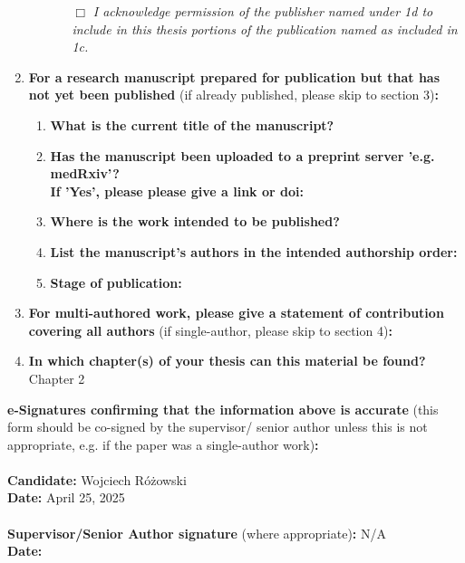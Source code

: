 \begin{enumerate}
\begin{enumerate}
\begin{itemize}
				\item[$\Box$] {\itshape I acknowledge permission of the publisher named under 1d to include in this thesis portions of the publication named as included in 1c.}
			\end{itemize}
%		
		\end{enumerate}
%	
		\item \textbf{For a research manuscript prepared for publication but that has not yet been published} (if already published, please skip to section 3)\textbf{:}
%		
		\begin{enumerate}\itemsep0em
			\item \textbf{What is the current title of the manuscript?}
			\item \textbf{Has the manuscript been uploaded to a preprint server 'e.g. medRxiv'? 
			\\
			If 'Yes', please please give a link or doi:}
			\item \textbf{Where is the work intended to be published?}
			\item \textbf{List the manuscript's authors in the intended authorship order:}
			\item \textbf{Stage of publication:}
		\end{enumerate}
		
		\item \textbf{For multi-authored work, please give a statement of contribution covering all authors} (if single-author, please skip to section 4)\textbf{:}
		


		\item \textbf{In which chapter(s) of your thesis can this material be found?}\\
		Chapter 2
	\end{enumerate}

		\textbf{e-Signatures confirming that the information above is accurate}
		(this form should be co-signed by the supervisor/ senior author unless this is not appropriate, e.g. if the paper was a single-author work)\textbf{:}\\
		\textbf{}\\ 
		\textbf{Candidate:}  Wojciech R\'{o}\.{z}owski\\
		\textbf{Date:} April 25, 2025\\
		\textbf{}\\
		\textbf{Supervisor/Senior Author signature} (where appropriate)\textbf{:} N/A\\ 
		\textbf{Date:} 


